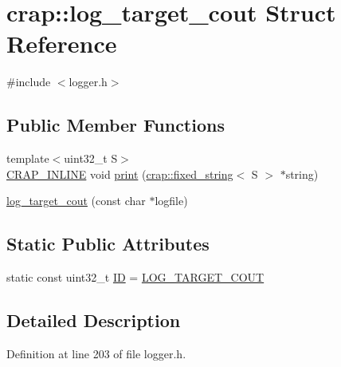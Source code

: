 \hypertarget{structcrap_1_1log__target__cout}{\section{crap\+:\+:log\+\_\+target\+\_\+cout Struct Reference}
\label{structcrap_1_1log__target__cout}
}


{\ttfamily \#include $<$logger.\+h$>$}

\subsection*{Public Member Functions}
\begin{DoxyCompactItemize}
\item 
{\footnotesize template$<$uint32\+\_\+t S$>$ }\\\hyperlink{config__x86_8h_a5a40526b8d842e7ff731509998bb0f1c}{C\+R\+A\+P\+\_\+\+I\+N\+L\+I\+N\+E} void \hyperlink{structcrap_1_1log__target__cout_a4b5c8d7fc6b1db6d5f20aabe7b562e8d}{print} (\hyperlink{classcrap_1_1fixed__string}{crap\+::fixed\+\_\+string}$<$ S $>$ $\ast$string)
\item 
\hyperlink{structcrap_1_1log__target__cout_a8ab8eda6c32d64b00f370fff8219af9d}{log\+\_\+target\+\_\+cout} (const char $\ast$logfile)
\end{DoxyCompactItemize}
\subsection*{Static Public Attributes}
\begin{DoxyCompactItemize}
\item 
static const uint32\+\_\+t \hyperlink{structcrap_1_1log__target__cout_a28042ea81a3466c87184a2c6c6cb2b02}{I\+D} = \hyperlink{logger_8h_ade1fdab2d4531d8bdf9b9bf22b96c44f}{L\+O\+G\+\_\+\+T\+A\+R\+G\+E\+T\+\_\+\+C\+O\+U\+T}
\end{DoxyCompactItemize}


\subsection{Detailed Description}


Definition at line 203 of file logger.\+h.



